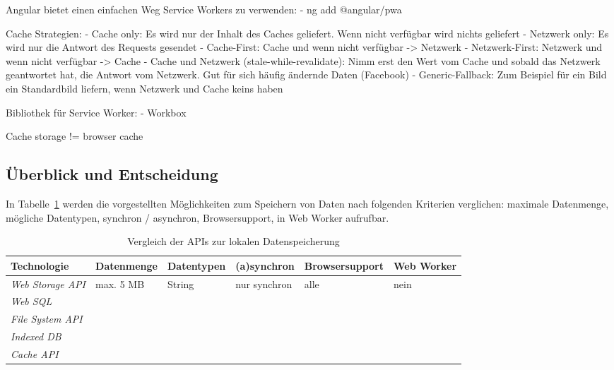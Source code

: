 Angular bietet einen einfachen Weg Service Workers zu verwenden:
- ng add @angular/pwa
\autocite{Hajian2019}

Cache Strategien:
- Cache only: Es wird nur der Inhalt des Caches geliefert. Wenn nicht verfügbar wird nichts geliefert
- Netzwerk only: Es wird nur die Antwort des Requests gesendet
- Cache-First: Cache und wenn nicht verfügbar -> Netzwerk
- Netzwerk-First: Netzwerk und wenn nicht verfügbar -> Cache
- Cache und Netzwerk (stale-while-revalidate): Nimm erst den Wert vom Cache und sobald das Netzwerk geantwortet hat, die Antwort vom Netzwerk. Gut für sich häufig ändernde Daten (Facebook)
- Generic-Fallback: Zum Beispiel für ein Bild ein Standardbild liefern, wenn Netzwerk und Cache keins haben
\autocite{Hajian2019} \autocite{Rojas2020}

Bibliothek für Service Worker:
- Workbox
\autocite{Rojas2020}

Cache storage != browser cache \autocite{Rojas2020}

\subsection{Überblick und Entscheidung}
In Tabelle~\ref{Kap4:Datenspeicherung} werden die vorgestellten Möglichkeiten zum Speichern von Daten nach folgenden Kriterien verglichen: maximale Datenmenge, mögliche Datentypen, synchron / asynchron, Browsersupport, in Web Worker aufrufbar.

\begin{table}[h]
  \caption{Vergleich der APIs zur lokalen Datenspeicherung}
  \label{Kap4:Datenspeicherung}
  \renewcommand{\arraystretch}{1.2}
  \centering
  \sffamily
  \begin{footnotesize}
    \begin{tabularx}{1.0\textwidth}{l l l l l l}
      \toprule
      \textbf{Technologie} & \textbf{Datenmenge} & \textbf{Datentypen} & \textbf{(a)synchron} & \textbf{Browsersupport} & \textbf{Web Worker} \\
      \midrule
      \emph{Web Storage \ac{API}} & max. 5 \ac{MB} & String & nur synchron & alle & nein \\
      \emph{Web SQL} &  &  &  &  &  \\
      \emph{File System \ac{API}} &  &  &  &  &  \\
      \emph{Indexed DB} &  &  &  &  &  \\
      \emph{Cache \ac{API}} &  &  &  &  &  \\
      \bottomrule
    \end{tabularx}
  \end{footnotesize}
  \rmfamily
\end{table}

